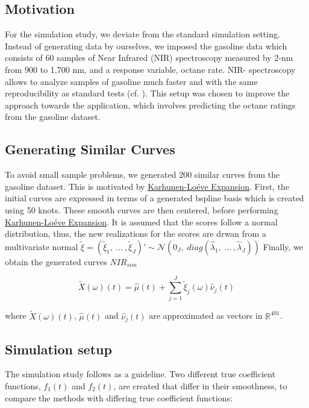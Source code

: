 \documentclass[11pt,twoside,a4paper]{article}
\begin{document}
	\subsection{Motivation}
	For the simulation study, we deviate from the standard simulation setting. Instead of generating data by ourselves, we imposed the gasoline data which consists of 60 samples of Near Infrared (NIR) spectroscopy measured by 2-nm from 900 to 1,700 nm, and a response variable, octane rate. NIR- spectroscopy allows to analyze samples of gasoline much faster and with the same reproducibility as standard tests (cf. \cite{Bohacs_Ovadi_Salgo1998}). This setup was chosen to improve the approach towards the application, which involves predicting the octane ratings from the gasoline dataset.
	
	\subsection{Generating Similar Curves}
	To avoid small sample problems, we generated 200 similar curves from the gasoline dataset. This is motivated by \hyperlink{KL}{Karhunen-Lo\'{e}ve Expansion}. First, the initial curves are expressed in terms of a generated bspline basis which is created using 50 knots. These smooth curves are then centered, before performing \hyperlink{KL}{Karhunen-Lo\'{e}ve Expansion}. It is assumed that the scores follow a normal distribution, thus, the new realizations for the scores are drwan from a multivariate normal $\tilde{\xi} = \left(\tilde{\xi}_{1},\: \dots \:, \tilde{\xi}_{J}\right)' \sim \mathcal{N}(0_J, \; diag(\hat{\lambda}_1,\: \dots\:, \hat{\lambda}_J))$ Finally, we obtain the generated curves $NIR_{sim}$
	
	
		$$\tilde{X}(\omega)(t) = \hat{\mu}(t) + \sum_{j = 1}^{J} \tilde{\xi}_j(\omega) \hat{\nu}_j(t)$$ 

		where
			$\tilde{X}(\omega)(t)$, $\hat{\mu}(t)$ and $\hat{\nu}_j(t)$ are approximated as vectors in $\mathbb{R}^{401}$.
		
	
    
    \subsection{Simulation setup}
	The simulation study follows \cite{Reiss_2007b} as a guideline. Two different true coefficient functions,  $f_1(t)$ and  $f_2(t)$, are created that differ in their smoothness, to compare the methods with differing true coefficient functions:
	
\end{document}
